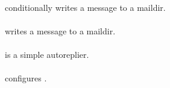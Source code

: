\documentclass{book}
\begin{document}
\paragraph{} conditionally writes a message to a maildir.

\paragraph{} writes a message to a maildir.

\paragraph{} is a simple autoreplier.

\paragraph{} configures .
\end{document}
